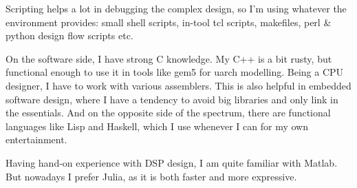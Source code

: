 \documentclass[a4paper]{scrartcl}
\begin{document}
Scripting helps a lot in debugging the complex design, so I'm using whatever the environment provides: small shell scripts, in-tool tcl scripts, makefiles, perl \& python design flow scripts etc. 

On the software side, I have strong C knowledge. My C++ is a bit rusty, but functional enough to use it in tools like gem5 for uarch modelling.
Being a CPU designer, I have to work with various assemblers. This is also helpful in embedded software design, where I have a tendency to avoid big libraries and only link in the essentials.
And on the opposite side of the spectrum, there are functional languages like Lisp and Haskell, which I use whenever I can for my own entertainment.

Having hand-on experience with DSP design, I am quite familiar with Matlab. But nowadays I prefer Julia, as it is both faster and more expressive. 
\end{document}
